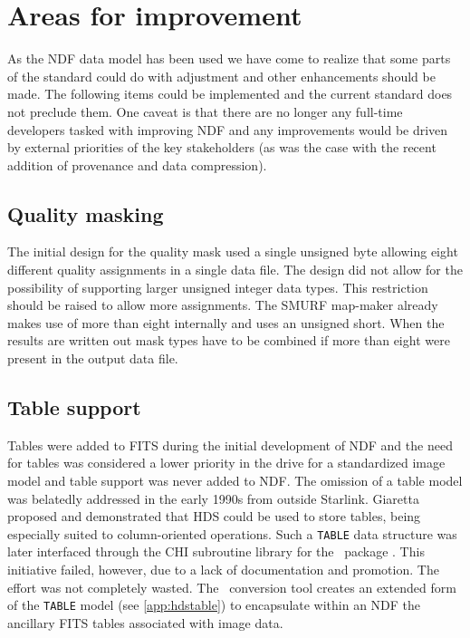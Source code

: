 \documentclass[final,authoryear,5p,times,twocolumn]{elsarticle}
\begin{document}
\section{Areas for improvement}
\label{sec:improve}

As the NDF data model has been used we have come to realize that some
parts of the standard could do with adjustment and other enhancements
should be made. The following items could be implemented and the
current standard does not preclude them. One caveat is that there are
no longer any full-time developers tasked with improving NDF and any
improvements would be driven by external priorities of the key
stakeholders (as was the case with the recent addition of provenance
and data compression).

\subsection{Quality masking}

The initial design for the quality mask used a single unsigned byte
allowing eight different quality assignments in a single data file. The
design did not allow for the possibility of supporting larger unsigned
integer data types. This restriction should be raised to allow more
assignments. The SMURF map-maker
\citep[][]{2013MNRAS.430.2545C} already makes use of more
than eight internally and uses an unsigned short. When the results are
written out mask types have to be combined if more than eight were present
in the output data file.

\subsection{Table support}

Tables were added to FITS \citep{1988A&AS...73..365H} during the
initial development of NDF and the need for tables was considered a
lower priority in the
drive for a standardized image model and table support was never added
to NDF.  The omission of a table model was belatedly addressed in the
early 1990s from outside Starlink.  Giaretta proposed and demonstrated
that HDS could be used to store tables, being especially suited to
column-oriented operations.  Such a \texttt{TABLE} data structure was
later interfaced through the CHI subroutine library \citep{SUN119} for
the \catpac\ package \citep{SUN120}.  This initiative failed, however,
due to a lack of documentation and promotion.  The effort was not
completely wasted.  The \fitstondf\ conversion tool \citep{SUN55}
creates an extended form of the \texttt{TABLE} model (see
\ref{app:hdstable}) to encapsulate within an NDF the ancillary FITS
tables associated with image data.
\end{document}

